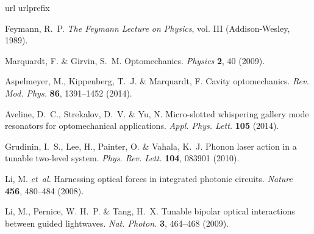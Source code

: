 \documentclass[12pt]{wlscirep}
\begin{document}
\begin{thebibliography}{10}
\expandafter\ifx\csname url\endcsname\relax
  \def\url#1{\texttt{#1}}\fi
\expandafter\ifx\csname urlprefix\endcsname\relax\def\urlprefix{URL }\fi
\providecommand{\bibinfo}[2]{#2}
\providecommand{\eprint}[2][]{\url{#2}}

\bibinfo{author}{Feymann, R.~P.}
\newblock \emph{\bibinfo{title}{The Feymann Lecture on Physics}}, vol.
  \bibinfo{volume}{III} (\bibinfo{publisher}{Addison-Wesley},
  \bibinfo{year}{1989}).

\bibinfo{author}{Marquardt, F.} \& \bibinfo{author}{Girvin, S.~M.}
\newblock \bibinfo{title}{Optomechanics}.
\newblock \emph{\bibinfo{journal}{Physics}} \textbf{\bibinfo{volume}{2}},
  \bibinfo{pages}{40} (\bibinfo{year}{2009}).

\bibinfo{author}{Aspelmeyer, M.}, \bibinfo{author}{Kippenberg, T.~J.} \&
  \bibinfo{author}{Marquardt, F.}
\newblock \bibinfo{title}{Cavity optomechanics}.
\newblock \emph{\bibinfo{journal}{Rev. Mod. Phys.}}
  \textbf{\bibinfo{volume}{86}}, \bibinfo{pages}{1391--1452}
  (\bibinfo{year}{2014}).

\bibinfo{author}{Aveline, D.~C.}, \bibinfo{author}{Strekalov, D.~V.} \&
  \bibinfo{author}{Yu, N.}
\newblock \bibinfo{title}{Micro-slotted whispering gallery mode resonators for
  optomechanical applications}.
\newblock \emph{\bibinfo{journal}{Appl. Phys. Lett.}}
  \textbf{\bibinfo{volume}{105}} (\bibinfo{year}{2014}).

\bibinfo{author}{Grudinin, I.~S.}, \bibinfo{author}{Lee, H.},
  \bibinfo{author}{Painter, O.} \& \bibinfo{author}{Vahala, K.~J.}
\newblock \bibinfo{title}{Phonon laser action in a tunable two-level system}.
\newblock \emph{\bibinfo{journal}{Phys. Rev. Lett.}}
  \textbf{\bibinfo{volume}{104}}, \bibinfo{pages}{083901}
  (\bibinfo{year}{2010}).

\bibinfo{author}{Li, M.} \emph{et~al.}
\newblock \bibinfo{title}{Harnessing optical forces in integrated photonic
  circuits}.
\newblock \emph{\bibinfo{journal}{Nature}} \textbf{\bibinfo{volume}{456}},
  \bibinfo{pages}{480--484} (\bibinfo{year}{2008}).

\bibinfo{author}{Li, M.}, \bibinfo{author}{Pernice, W. H.~P.} \&
  \bibinfo{author}{Tang, H.~X.}
\newblock \bibinfo{title}{Tunable bipolar optical interactions between guided
  lightwaves}.
\newblock \emph{\bibinfo{journal}{Nat. Photon.}} \textbf{\bibinfo{volume}{3}},
  \bibinfo{pages}{464--468} (\bibinfo{year}{2009}).


\end{thebibliography}
\end{document}
